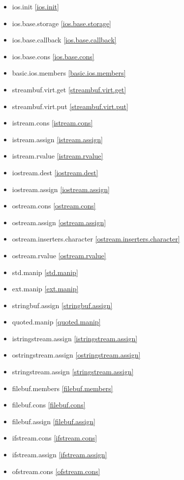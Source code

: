 \begin{multicols}{2}
\begin{itemize}
\item{ios.init}							\ref{ios.init}
\item{ios.base.storage}					\ref{ios.base.storage}
\item{ios.base.callback}				\ref{ios.base.callback}
\item{ios.base.cons}					\ref{ios.base.cons}
\item{basic.ios.members}				\ref{basic.ios.members}
\item{streambuf.virt.get}				\ref{streambuf.virt.get}
\item{streambuf.virt.put}				\ref{streambuf.virt.put}
\item{istream.cons}						\ref{istream.cons}
\item{istream.assign}					\ref{istream.assign}
\item{istream.rvalue}					\ref{istream.rvalue}
\item{iostream.dest}					\ref{iostream.dest}
\item{iostream.assign}					\ref{iostream.assign}
\item{ostream.cons}						\ref{ostream.cons}
\item{ostream.assign}					\ref{ostream.assign}
\item{ostream.inserters.character}		\ref{ostream.inserters.character}
\item{ostream.rvalue}					\ref{ostream.rvalue}
\item{std.manip}						\ref{std.manip}
\item{ext.manip}						\ref{ext.manip}
\item{stringbuf.assign}					\ref{stringbuf.assign}
\item{quoted.manip}						\ref{quoted.manip}
\item{istringstream.assign}				\ref{istringstream.assign}
\item{ostringstream.assign}				\ref{ostringstream.assign}
\item{stringstream.assign}				\ref{stringstream.assign}
\item{filebuf.members}					\ref{filebuf.members}
\item{filebuf.cons}						\ref{filebuf.cons}
\item{filebuf.assign}					\ref{filebuf.assign}
\item{ifstream.cons}					\ref{ifstream.cons}
\item{ifstream.assign}					\ref{ifstream.assign}
\item{ofstream.cons}					\ref{ofstream.cons}

\end{itemize}
\end{multicols}
